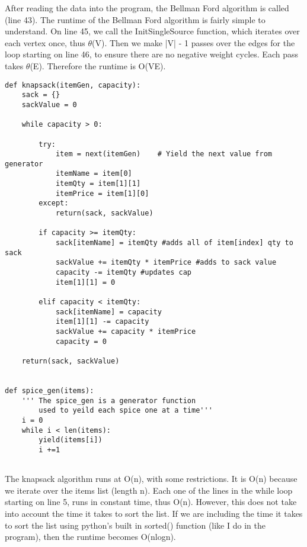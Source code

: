 \documentclass{article}
\begin{document}
\vspace{5mm}
After reading the data into the program, the Bellman Ford algorithm is called (line 43). The runtime of the Bellman Ford algorithm is fairly simple to understand. On line 45, we call the InitSingleSource function, which iterates over each vertex once, thus $\theta$(V). Then we make |V| - 1 passes over the edges for the loop starting on line 46, to ensure there are no negative weight cycles. Each pass takes $\theta$(E). Therefore the runtime is O(VE).
\vspace{5mm}



\begin{lstlisting}
def knapsack(itemGen, capacity):
    sack = {}
    sackValue = 0

    while capacity > 0:

        try:
            item = next(itemGen)    # Yield the next value from generator
            itemName = item[0]
            itemQty = item[1][1]
            itemPrice = item[1][0]
        except:
            return(sack, sackValue)

        if capacity >= itemQty:
            sack[itemName] = itemQty #adds all of item[index] qty to sack
            sackValue += itemQty * itemPrice #adds to sack value
            capacity -= itemQty #updates cap
            item[1][1] = 0

        elif capacity < itemQty:
            sack[itemName] = capacity
            item[1][1] -= capacity
            sackValue += capacity * itemPrice
            capacity = 0

    return(sack, sackValue)


def spice_gen(items):
    ''' The spice_gen is a generator function
        used to yeild each spice one at a time'''
    i = 0
    while i < len(items):
        yield(items[i])
        i +=1


\end{lstlisting}
\vspace{5mm}
The knapsack algorithm runs at O(n), with some restrictions. It is O(n) because we iterate over the items list (length n). Each one of the lines in the while loop starting on line 5, runs in constant time, thus O(n). However, this does not take into account the time it takes to sort the list. If we are including the time it takes to sort the list using python's built in sorted() function (like I do in the program), then the runtime becomes O(nlogn).
\vspace{5mm}
\end{document}
